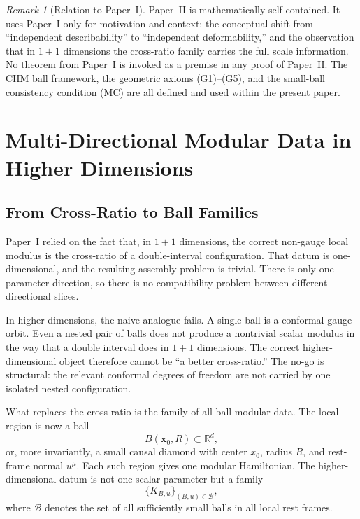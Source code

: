 \documentclass[12pt]{article}
\theoremstyle{definition}
\theoremstyle{remark}
\newtheorem{remark}[theorem]{Remark}
\begin{document}
\begin{remark}[Relation to Paper~I]
Paper~II is mathematically self-contained. It uses Paper~I only for
motivation and context: the conceptual shift from ``independent
describability'' to ``independent deformability,'' and the observation
that in \(1+1\) dimensions the cross-ratio family carries the full
scale information. No theorem from Paper~I is invoked as a premise in
any proof of Paper~II. The CHM ball framework, the geometric axioms
(G1)--(G5), and the small-ball consistency condition (MC) are all
defined and used within the present paper.
\end{remark}

\section{Multi-Directional Modular Data in Higher Dimensions}\label{sec:2}

\subsection{From Cross-Ratio to Ball Families}\label{subsec:2.1}

Paper~I\cite{PaperI} relied on the fact that, in \(1+1\) dimensions, the correct non-gauge local modulus is the cross-ratio of a double-interval configuration. That datum is one-dimensional, and the resulting assembly problem is trivial. There is only one parameter direction, so there is no compatibility problem between different directional slices.

In higher dimensions, the naive analogue fails. A single ball is a conformal gauge orbit. Even a nested pair of balls does not produce a nontrivial scalar modulus in the way that a double interval does in \(1+1\) dimensions. The correct higher-dimensional object therefore cannot be ``a better cross-ratio.'' The no-go is structural: the relevant conformal degrees of freedom are not carried by one isolated nested configuration.

What replaces the cross-ratio is the family of all ball modular data. The local region is now a ball
\[
B(\mathbf{x}_0,R)\subset \mathbb{R}^d,
\]
or, more invariantly, a small causal diamond with center \(x_0\), radius \(R\), and rest-frame normal \(u^\mu\). Each such region gives one modular Hamiltonian. The higher-dimensional datum is not one scalar parameter but a family
\[
\{K_{B,u}\}_{(B,u)\in\mathcal{B}},
\]
where \(\mathcal{B}\) denotes the set of all sufficiently small balls in all local rest frames.
\end{document}
